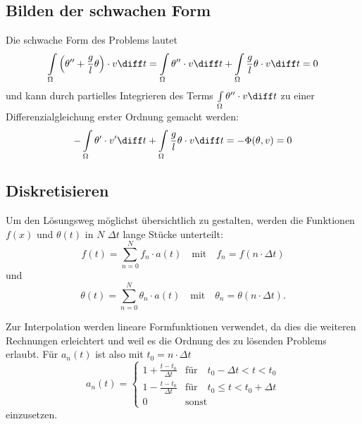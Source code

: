 \subsection{Bilden der schwachen Form}
Die schwache Form des Problems lautet
\begin{equation}
    \int\limits_\Omega \left( \theta'' + \frac{g}{l} \theta \right) \cdot v \diff t 
    = \int\limits_\Omega \theta'' \cdot v \diff t + \int\limits_\Omega \frac{g}{l} \theta \cdot v \diff t
    = 0
\end{equation}
und kann durch partielles Integrieren des Terms $\int\limits_\Omega \theta'' \cdot v \diff t$ zu einer Differenzialgleichung erster Ordnung gemacht werden:
\begin{equation}
    - \int\limits_\Omega \theta' \cdot v' \diff t + \int\limits_\Omega \frac{g}{l} \theta \cdot v \diff t = -\Phi(\theta, v) = 0
    \label{fem:rechenbsp:schwache_form}
\end{equation}


\subsection{Diskretisieren}
Um den Lösungsweg möglichst übersichtlich zu gestalten, werden die Funktionen $f(x)$ und $\theta(t)$ in $N$ $\Delta t$ lange Stücke unterteilt:
\begin{equation}
    f(t) = \sum_{n=0}^{N} f_n \cdot a(t) \quad
    \text{mit} \quad
    f_n = f(n \cdot \Delta t)
\end{equation}
und
\begin{equation}
    \theta(t) = \sum_{n=0}^{N} \theta_n \cdot a(t) \quad
    \text{mit} \quad
    \theta_n = \theta(n \cdot \Delta t).
\end{equation}

Zur Interpolation werden lineare Formfunktionen verwendet, da dies die weiteren Rechnungen erleichtert und weil es die Ordnung des zu lösenden Problems erlaubt.
Für $a_n(t)$ ist also mit $t_0 = n \cdot \Delta t$
\begin{equation}
    a_n(t) = \left\{ \begin{array}{ll}
        1+\frac{t-t_0}{\Delta t} & \text{für} \quad t_0 - \Delta t < t < t_0 \\
        1-\frac{t-t_0}{\Delta t} & \text{für} \quad t_0 \leq t < t_0 + \Delta t \\
        0 & \text{sonst}
    \end{array} \right.
\end{equation}
einzusetzen.


